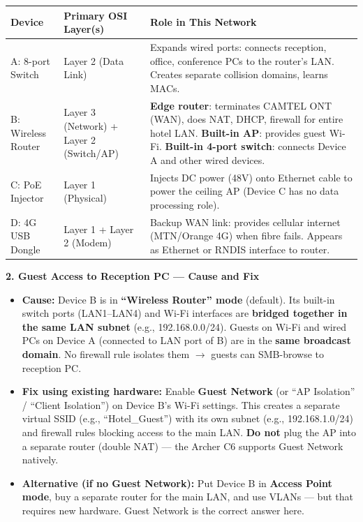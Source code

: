 \documentclass[11pt]{article}
\begin{document}
\begin{exoresolu}
\begin{center}
\begin{tabularx}{\linewidth}{|l|l|X|}\hline
\rowcolor{popblueL}
\textbf{Device} & \textbf{Primary OSI Layer(s)} & \textbf{Role in This Network} \\ \hline
A: 8-port Switch & Layer 2 (Data Link) & Expands wired ports: connects reception, office, conference PCs to the router's LAN. Creates separate collision domains, learns MACs. \\ \hline
B: Wireless Router & Layer 3 (Network) + Layer 2 (Switch/AP) & \textbf{Edge router}: terminates CAMTEL ONT (WAN), does NAT, DHCP, firewall for entire hotel LAN. \textbf{Built-in AP}: provides guest Wi-Fi. \textbf{Built-in 4-port switch}: connects Device A and other wired devices. \\ \hline
C: PoE Injector & Layer 1 (Physical) & Injects DC power (48V) onto Ethernet cable to power the ceiling AP (Device C has no data processing role). \\ \hline
D: 4G USB Dongle & Layer 1 + Layer 2 (Modem) & Backup WAN link: provides cellular internet (MTN/Orange 4G) when fibre fails. Appears as Ethernet or RNDIS interface to router. \\ \hline
\end{tabularx}
\end{center}

\textbf{2. Guest Access to Reception PC — Cause and Fix}
\begin{itemize}
\item \textbf{Cause:} Device B is in \textbf{``Wireless Router'' mode} (default). Its built-in switch ports (LAN1–LAN4) and Wi-Fi interfaces are \textbf{bridged together in the same LAN subnet} (e.g., 192.168.0.0/24). Guests on Wi-Fi and wired PCs on Device A (connected to LAN port of B) are in the \textbf{same broadcast domain}. No firewall rule isolates them $\rightarrow$ guests can SMB-browse to reception PC.
\item \textbf{Fix using existing hardware:} Enable \textbf{Guest Network} (or ``AP Isolation'' / ``Client Isolation'') on Device B's Wi-Fi settings. This creates a separate virtual SSID (e.g., ``Hotel\_Guest'') with its own subnet (e.g., 192.168.1.0/24) and firewall rules blocking access to the main LAN. \textbf{Do not} plug the AP into a separate router (double NAT) — the Archer C6 supports Guest Network natively.
\item \textbf{Alternative (if no Guest Network):} Put Device B in \textbf{Access Point mode}, buy a separate router for the main LAN, and use VLANs — but that requires new hardware. Guest Network is the correct answer here.
\end{itemize}


\end{exoresolu}
\end{document}
